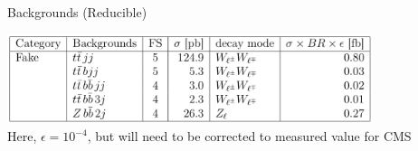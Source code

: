 
\begin{frame}{Backgrounds (Reducible)}
  \begin{center}
    \includegraphics[width=0.8\textwidth]{figures/reducible-backgrounds}
  \\
  Here, $\epsilon=10^{-4}$, but will need to be corrected to measured value for CMS
  \end{center}
\end{frame}
